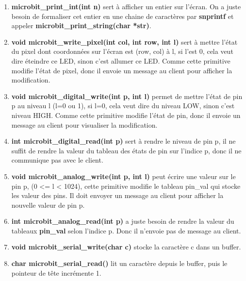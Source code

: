 \documentclass[14px]{article}
\begin{document}
\begin{enumerate}
		\item \textbf{microbit\_print\_int(int n)} sert à afficher un entier sur l'écran. On a juste besoin de formaliser cet entier en une chaine de caractères par \textbf{snprintf} et appeler \textbf{microbit\_print\_string(char *str)}.
		
		\item \textbf{void microbit\_write\_pixel(int col, int row, int l)} sert à mettre l'état du pixel dont coordonnées sur l'écran est (row, col) à l, si l’est 0, cela veut dire éteindre ce LED, sinon c'est allumer ce LED. Comme cette primitive modifie l'état de pixel, donc il envoie un message au client pour afficher la modification.
		
		\item \textbf{void microbit\_digital\_write(int p, int l)} permet de mettre l'état de pin p au niveau l (l=0 ou 1), si l=0, cela veut dire du niveau LOW, sinon c'est niveau HIGH. Comme cette primitive modifie l'état de pin, donc il envoie un message au client pour visualiser la modification.
		
		\item \textbf{int microbit\_digital\_read(int p)} sert à rendre le niveau de pin p, il ne suffit de rendre la valeur du tableau des états de pin sur l'indice p, donc il ne communique pas avec le client.
		
		\item \textbf{void microbit\_analog\_write(int p, int l)} peut écrire une valeur sur le pin p, (0 <= l < 1024), cette primitive modifie le tableau pin\_val qui stocke les valeur des pins. Il doit envoyer un message au client pour afficher la nouvelle valeur de pin p.
		
		\item \textbf{int microbit\_analog\_read(int p)} a juste besoin de rendre la valeur du tableaux \textbf{pin\_val} selon l'indice p. Donc il n'envoie pas de message au client. 
		
		\item \textbf{void microbit\_serial\_write(char c)} stocke la caractère c dans un buffer.
		
		\item \textbf{char microbit\_serial\_read()} lit un caractère depuis le buffer, puis le pointeur de tête incrémente 1.
	\end{enumerate}
\end{document}
